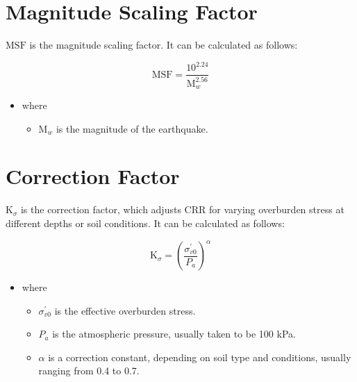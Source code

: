 \clearpage
\newpage

\section{Magnitude Scaling Factor}
\(\mathrm{MSF}\) is the magnitude scaling factor. It can be calculated as follows:

\begin{equation}
    \mathrm{MSF} = \frac{10^{2.24}}{\mathrm{M}_{w}^{2.56}}
\end{equation}

\begin{itemize}
    \item where
    \begin{itemize}
        \item \(\mathrm{M}_{w}\) is the magnitude of the earthquake.
    \end{itemize}
\end{itemize}

\section{Correction Factor}
\(\mathrm{K}_{\sigma}\) is the correction factor, which adjusts \(\mathrm{CRR}\) for varying overburden stress at different depths or soil conditions. It can be calculated as follows:

\begin{equation}
    \mathrm{K}_{\sigma} = \left(\frac{\sigma_{v0}^{'}}{P_{a}}\right)^{\alpha}
\end{equation}

\begin{itemize}
    \item where
    \begin{itemize}
        \item \(\sigma_{v0}^{'}\) is the effective overburden stress.
        \item \(P_{a}\) is the atmospheric pressure, usually taken to be 100 kPa.
        \item \(\alpha\) is a correction constant, depending on soil type and conditions, usually ranging from 0.4 to 0.7.
    \end{itemize}
\end{itemize}
